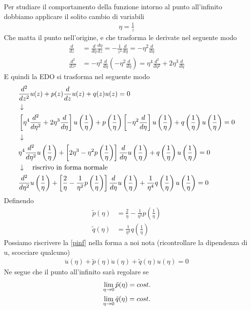 Per studiare il comportamento della funzione intorno al punto all'infinito dobbiamo applicare il solito cambio di variabili
\begin{align}
	\eta = \frac{1}{z}
\end{align}
Che matta il punto nell'origine, e che trasforma le derivate nel seguente modo
\begin{align}
	\frac{d}{dz} &= \frac{d}{d\eta} \frac{d\eta}{dz} = -\frac{1}{z^2} \frac{d}{d\eta} = -\eta^2 \frac{d}{d\eta}\\
	\frac{d^2}{dz^2} &= -\eta^2 \frac{d}{d\eta} \left(-\eta^2 \frac{d}{d\eta}\right) = \eta^4 \frac{d^2}{d\eta^2} + 2\eta^3 \frac{d}{d\eta}
\end{align}
E quindi la EDO si trasforma nel seguente modo
\begin{align}
	&\frac{d^2}{dz^2} u(z) + p(z)\frac{d}{dz} u(z) + q(z)u(z) = 0 \\ &\downarrow \nonumber \\
	&\left[\eta^4 \frac{d^2}{d\eta^2} + 2\eta^3 \frac{d}{d\eta}\right] u\left(\frac{1}{\eta}\right) + p\left(\frac{1}{\eta}\right)\left[-\eta^2 \frac{d}{d\eta}\right]u\left(\frac{1}{\eta}\right) + q\left(\frac{1}{\eta}\right)u\left(\frac{1}{\eta}\right) = 0 \nonumber \\ &\downarrow \nonumber \\
	&\eta^4 \frac{d^2}{d\eta^2}u\left(\frac{1}{\eta}\right) + \left[2\eta^3 -\eta^2p\left(\frac{1}{\eta}\right) \right] \frac{d}{d\eta}u\left(\frac{1}{\eta}\right) + q\left(\frac{1}{\eta}\right)u\left(\frac{1}{\eta}\right) = 0 \nonumber \\ &\downarrow \quad \text{riscrivo in forma normale} \nonumber \\
	&\frac{d^2}{d\eta^2}u\left(\frac{1}{\eta}\right) + \left[\frac{2}{\eta} -\frac{1}{\eta^2}p\left(\frac{1}{\eta}\right) \right] \frac{d}{d\eta}u\left(\frac{1}{\eta}\right) + \frac{1}{\eta^4} q\left(\frac{1}{\eta}\right)u\left(\frac{1}{\eta}\right) = 0 \label{pinf}
\end{align}
Definendo
\begin{align}
	\tilde{p}(\eta) &= \frac{2}{\eta} -\frac{1}{\eta^2}p\left(\frac{1}{\eta}\right) \\
	\tilde{q}(\eta) &= \frac{1}{\eta^4} q\left(\frac{1}{\eta}\right)
\end{align}
Possiamo riscrivere la \ref{pinf} nella forma a noi nota (ricontrollare la dipendenza di u, scocciare qualcuno)
\begin{align}
	\ddot{u}(\eta) + \tilde{p}(\eta) \dot{u}(\eta) + \tilde{q}(\eta) u(\eta) = 0
\end{align}
Ne segue che il punto all'infinito sarà regolare se
\begin{align}
	&\underset{\eta \rightarrow 0}{\lim} \, \tilde{p}(\eta) = cost.\\
	&\underset{\eta \rightarrow 0}{\lim} \, \tilde{q}(\eta) = cost.
\end{align}
